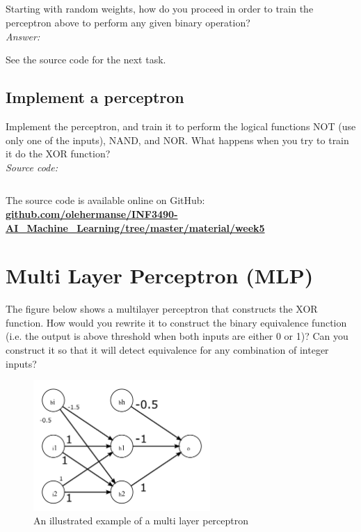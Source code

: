 \subsection{}
Starting with random weights, how do you proceed in order to train the perceptron above to perform any given binary operation?\\

\noindent\textit{Answer:}

\noindent
See the source code for the next task.

\subsection{Implement a perceptron \marginsymbol}
Implement the perceptron, and train it to perform the logical functions NOT (use only one of the inputs), NAND, and NOR.
What happens when you try to train it do the XOR function?\\

\textit{Source code:}
\inputminted{Python}{bool_perceptron.py}
The source code is available online on GitHub:\\
\href{https://github.com/olehermanse/INF3490-AI_Machine_Learning/tree/master/material/week5}{\textbf{github.com/olehermanse/INF3490-AI\_Machine\_Learning/tree/master/material/week5}}

\section{Multi Layer Perceptron (MLP)}
The figure below shows a multilayer perceptron that constructs the XOR function.
How would you rewrite it to construct the binary equivalence function
(i.e. the output is above threshold when both inputs are either 0 or 1)?
Can you construct it so that it will detect equivalence for any combination of integer inputs?

\begin{figure}[H]
\begin{center}
\includegraphics[width=0.6\textwidth]{fig2.png}
\caption{An illustrated example of a multi layer perceptron}
\label{fig:mlp}
\end{center}
\end{figure}

